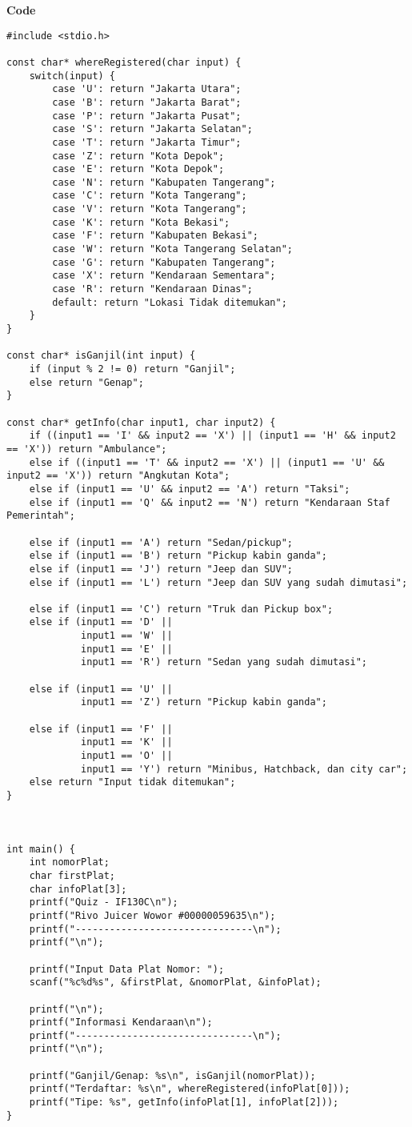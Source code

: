 \documentclass[a4paper, 10pt]{article}
\begin{document}
        \large \textbf{Code}
        \begin{lstlisting}[style=code]
#include <stdio.h>

const char* whereRegistered(char input) {
    switch(input) {
        case 'U': return "Jakarta Utara";
        case 'B': return "Jakarta Barat";
        case 'P': return "Jakarta Pusat";
        case 'S': return "Jakarta Selatan";
        case 'T': return "Jakarta Timur";
        case 'Z': return "Kota Depok";
        case 'E': return "Kota Depok";
        case 'N': return "Kabupaten Tangerang";
        case 'C': return "Kota Tangerang";
        case 'V': return "Kota Tangerang";
        case 'K': return "Kota Bekasi";
        case 'F': return "Kabupaten Bekasi";
        case 'W': return "Kota Tangerang Selatan";
        case 'G': return "Kabupaten Tangerang";
        case 'X': return "Kendaraan Sementara";
        case 'R': return "Kendaraan Dinas";
        default: return "Lokasi Tidak ditemukan";
    }
}

const char* isGanjil(int input) {
    if (input % 2 != 0) return "Ganjil";
    else return "Genap";
}

const char* getInfo(char input1, char input2) {
    if ((input1 == 'I' && input2 == 'X') || (input1 == 'H' && input2 == 'X')) return "Ambulance";
    else if ((input1 == 'T' && input2 == 'X') || (input1 == 'U' && input2 == 'X')) return "Angkutan Kota";
    else if (input1 == 'U' && input2 == 'A') return "Taksi";
    else if (input1 == 'Q' && input2 == 'N') return "Kendaraan Staf Pemerintah";

    else if (input1 == 'A') return "Sedan/pickup";
    else if (input1 == 'B') return "Pickup kabin ganda";
    else if (input1 == 'J') return "Jeep dan SUV";
    else if (input1 == 'L') return "Jeep dan SUV yang sudah dimutasi";

    else if (input1 == 'C') return "Truk dan Pickup box";
    else if (input1 == 'D' ||
             input1 == 'W' ||
             input1 == 'E' ||
             input1 == 'R') return "Sedan yang sudah dimutasi";

    else if (input1 == 'U' ||
             input1 == 'Z') return "Pickup kabin ganda";

    else if (input1 == 'F' ||
             input1 == 'K' ||
             input1 == 'O' ||
             input1 == 'Y') return "Minibus, Hatchback, dan city car";
    else return "Input tidak ditemukan";
}



int main() {
    int nomorPlat;
    char firstPlat;
    char infoPlat[3];
    printf("Quiz - IF130C\n");
    printf("Rivo Juicer Wowor #00000059635\n");
    printf("-------------------------------\n");
    printf("\n");

    printf("Input Data Plat Nomor: ");
    scanf("%c%d%s", &firstPlat, &nomorPlat, &infoPlat);

    printf("\n");
    printf("Informasi Kendaraan\n");
    printf("-------------------------------\n");
    printf("\n");

    printf("Ganjil/Genap: %s\n", isGanjil(nomorPlat));
    printf("Terdaftar: %s\n", whereRegistered(infoPlat[0]));
    printf("Tipe: %s", getInfo(infoPlat[1], infoPlat[2]));
}
        \end{lstlisting}
\end{document}
